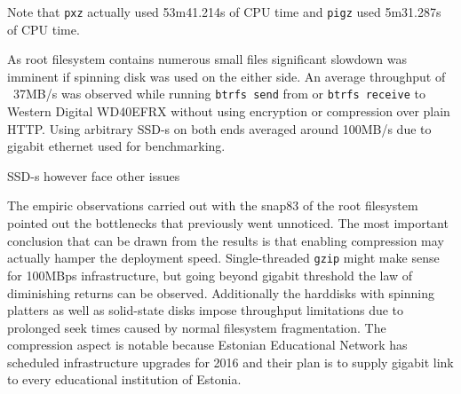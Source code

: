 \documentclass[a4paper,11pt]{kth-mag}
\begin{document}
Note that \texttt{pxz} actually used 53m41.214s of CPU time
and \texttt{pigz} used 5m31.287s of CPU time.

As root filesystem contains numerous small files significant
slowdown was imminent if spinning disk was used on the either side.
An average throughput of ~37MB/s was observed while
running \texttt{btrfs send} from or \texttt{btrfs receive} to
Western Digital WD40EFRX without using encryption or compression
over plain HTTP.
Using arbitrary SSD-s on both ends averaged around 100MB/s
due to gigabit ethernet used for benchmarking.

SSD-s however face other issues



The empiric observations carried out with
the snap83 of the root filesystem  pointed out
the bottlenecks that previously went unnoticed.
The most important conclusion that can be drawn from the 
results is that enabling compression may actually hamper the
deployment speed.
Single-threaded \texttt{gzip} might make sense for 100MBps infrastructure,
but going beyond gigabit threshold the law of diminishing returns can be observed.
Additionally the harddisks with spinning platters
as well as solid-state disks impose throughput
limitations due to prolonged seek times
caused by normal filesystem fragmentation. 
The compression aspect is notable because
Estonian Educational Network has scheduled infrastructure
upgrades for 2016 and their plan is to supply
gigabit link to every educational institution of Estonia.
\end{document}
